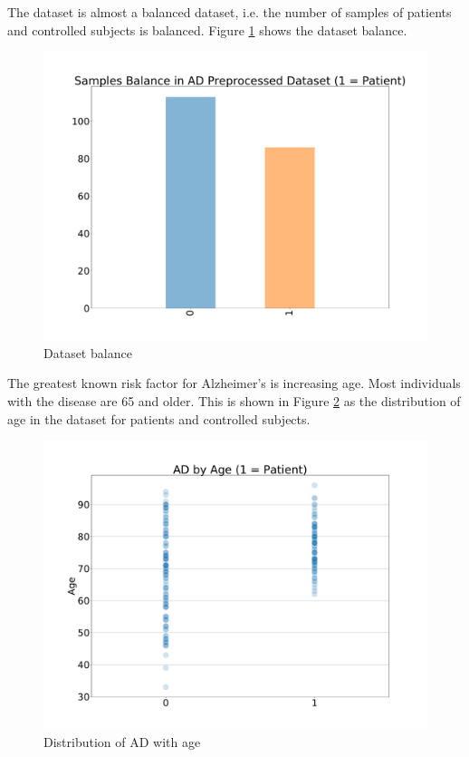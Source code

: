 The dataset is almost a balanced dataset, i.e. the number of samples of patients and controlled subjects is balanced. Figure \ref{fig:dataset-balance} shows the dataset balance. 
\begin{figure}
	\centering
	\includegraphics[width=\columnwidth]{images/dataset-balance.pdf}
	\caption{Dataset balance}
	\label{fig:dataset-balance}
\end{figure} 

The greatest known risk factor for Alzheimer’s is increasing age. Most individuals with the disease are 65 and older. This is shown in Figure \ref{fig:AD-distribution-age} as the distribution of age in the dataset for patients and controlled subjects.

\begin{figure}
	\centering
	\includegraphics[width=\columnwidth]{images/AD-distribution-age.pdf}
	\caption{Distribution of AD with age}
	\label{fig:AD-distribution-age}
\end{figure} 

